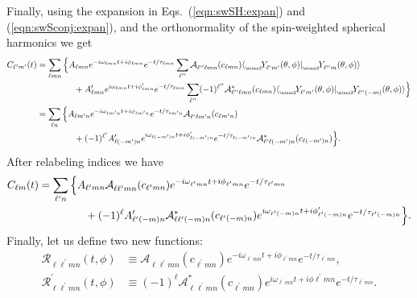 \documentclass[11pt]{article}
\newcommand{\braket}[2]{\langle #1|#2\rangle}
\newcommand{\swY}[4][]{{}_{{}_{#2}}\!Y^{#1}_{#3}(#4)}
\newcommand{\YSH}[3][]{\mathcal{A}^{#1}_{#2}(#3)}
\begin{document}
\noindent
Finally, using the expansion in Eqs.~(\ref{eqn:swSH:expan}) and (\ref{eqn:swSconj:expan}), and
the orthonormality of the spin-weighted spherical harmonics we get
\begin{equation}
\begin{aligned} \label{clm:eq3}
C_{\ell^\prime{m}^\prime}(t) & = \sum_{\ell{m}n} \Big\{ 
   A_{\ell{m}n} e^{-i\omega_{\ell{m}n}t+i\phi_{\ell{m}n}}e^{-t/\tau_{\ell{m}n}}
    \sum_{\ell^{\prime\prime}} \YSH{\ell^{\prime\prime}\ell{m}n}{c_{\ell{m}n}}
    \braket{\swY{\minus 2}{\ell^\prime{m}^\prime}{\theta,\phi}}{\swY{\minus 2}{\ell^{\prime\prime}m}{\theta,\phi}} \\
& {} \hspace{0.6in}
  + A^\prime_{\ell{m}n} e^{i\omega_{\ell{m}n}t+i\phi^\prime_{\ell{m}n}}e^{-t/\tau_{\ell{m}n}}
    \sum_{\ell^{\prime\prime}} (-1)^{\ell^{\prime\prime}} \YSH[*]{\ell^{\prime\prime}\ell{m}n}{c_{\ell{m}n}}
    \braket{\swY{\minus 2}{\ell^\prime{m}^\prime}{\theta,\phi}}{\swY{\minus 2}{\ell^{\prime\prime}(-m)}{\theta,\phi}} \Big\} \\ 
 & = \sum_{\ell{n}} \Big\{ 
   A_{\ell{m^\prime}n} e^{-i\omega_{\ell{m^\prime}n}t+i\phi_{\ell{m^\prime}n}}e^{-t/\tau_{\ell{m^\prime}n}}
    \YSH{\ell^\prime\ell{m^\prime}n}{c_{\ell{m^\prime}n}} \\
& {} \hspace{0.6in}
  + (-1)^{\ell^\prime}A^\prime_{\ell(-m^\prime)n} e^{i\omega_{\ell(-m^\prime)n}t+i\phi^\prime_{\ell(-m^\prime)n}}e^{-t/\tau_{\ell(-m^\prime)n}}
    \YSH[*]{\ell^\prime\ell(-m^\prime)n}{c_{\ell(-m^\prime)n}} \Big\}.
\end{aligned}
\end{equation}
After relabeling indices we have
\begin{equation}
\begin{aligned}
 C_{\ell{m}}(t) & = \sum_{\ell^\prime{n}} \Big\{ 
   A_{\ell^\prime{m}n}\YSH{\ell\ell^\prime{m}n}{c_{\ell^\prime{m}n}}
    e^{-i\omega_{\ell^\prime{m}n}t+i\phi_{\ell^\prime{m}n}}e^{-t/\tau_{\ell^\prime{m}n}} \\
& {} \hspace{0.6in}
  + (-1)^\ell A^\prime_{\ell^\prime(-m)n}
    \YSH[*]{\ell\ell^\prime(-m)n}{c_{\ell^\prime(-m)n}}
    e^{i\omega_{\ell^\prime(-m)n}t+i\phi^\prime_{\ell^\prime(-m)n}}e^{-t/\tau_{\ell^\prime(-m)n}} \Big\}.
\end{aligned}
\end{equation}
Finally, let us define two new functions:
\begin{align}
  \mathcal{R}_{\ell\ell^\prime{m}n}(t,\phi) &\equiv 
    \YSH{\ell\ell^\prime{m}n}{c_{\ell^\prime{m}n}}
    e^{-i\omega_{\ell^\prime{m}n}t+i\phi_{\ell^\prime{m}n}}e^{-t/\tau_{\ell^\prime{m}n}}, \\
  \mathcal{R}^\prime_{\ell\ell^\prime{m}n}(t,\phi) &\equiv  
    (-1)^\ell\YSH[*]{\ell\ell^\prime{m}n}{c_{\ell^\prime{m}n}}
    e^{i\omega_{\ell^\prime{m}n}t+i\phi{\ell^\prime{m}n}}e^{-t/\tau_{\ell^\prime{m}n}}.
\end{align}
\end{document}
